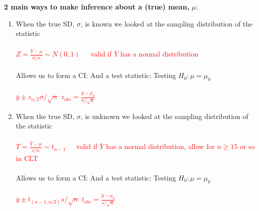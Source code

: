 \noindent\large \textbf{2 main ways to make inference about a (true) mean,} $\mu$:\normalsize\\
\begin{enumerate}
\item When the true SD, $\sigma$, is known we looked at the sampling distribution of the statistic\\~\\
\textcolor{red}{$Z=\frac{\bar{Y}-\mu}{\sigma/n} \sim N(0,1)$~~~valid if $\bar{Y}$ has a normal distribution}\\~\\
Allows us to form a CI:	\hspace{2in}		And a test statistic: Testing $H_0: \mu=\mu_0$\\~\\
\textcolor{red}{$\bar{y}\pm z_{\alpha/2}\sigma/\sqrt{n}$ \hspace{2.5in} $z_{obs}=\frac{\bar{y}-\mu_0}{\sigma/\sqrt{n}}$}\\

\item When the true SD, $\sigma$, is unknown we looked at the sampling distribution of the statistic\\~\\
\textcolor{red}{$T=\frac{\bar{Y}-\mu}{s/n} \sim t_{n-1}$~~~valid if $\bar{Y}$ has a normal distribution, allow for $n\geq 15$ or so in CLT}\\~\\
Allows us to form a CI:	\hspace{2in}		And a test statistic: Testing $H_0: \mu=\mu_0$\\~\\
\textcolor{red}{$\bar{y}\pm t_{(n-1,\alpha/2)}s/\sqrt{n}$ \hspace{2.4in} $t_{obs}=\frac{\bar{y}-\mu_0}{s/\sqrt{n}}$}\\
\end{enumerate}

\newpage

